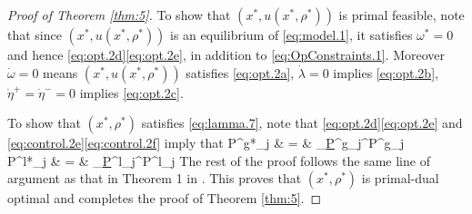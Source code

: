 \begin{proof}[Proof of Theorem \ref{thm:5}]
	To show that $(x^*, u(x^*, \rho^*))$ is primal feasible, note that since 
	$(x^*, u(x^*, \rho^*))$ is an equilibrium of \eqref{eq:model.1}, it satisfies 
	$\omega^*=0$ and hence \eqref{eq:opt.2d}\eqref{eq:opt.2e}, in
	addition to \eqref{eq:OpConstraints.1}.
	Moreover $\dot\omega=0$ means $(x^*, u(x^*, \rho^*))$ satisfies
	\eqref{eq:opt.2a}, $\dot \lambda = 0$ implies \eqref{eq:opt.2b}, 
	$\dot \eta^+ = \dot \eta^- = 0$ implies \eqref{eq:opt.2c}.
	
	To show that $(x^*, \rho^*)$ satisfies 
	\eqref{eq:lamma.7}, note that 
	\eqref{eq:opt.2d}\eqref{eq:opt.2e} and \eqref{eq:control.2e}\eqref{eq:control.2f}
	imply that
	\bqn
	P^{g*}_j & = & _{\underline P^g_j}^{\overline P^g_j}
	\nonumber \\
	P^{l*}_j & = & _{\underline P^l_j}^{\overline P^l_j}
	\eqn
	The rest of the proof follows the same line of argument as that in Theorem 1 in \cite{Wang:DistributedFrequency}.
	This proves that $(x^*,\rho^*)$ is primal-dual optimal and completes the 
	proof of Theorem \ref{thm:5}.
\end{proof}

